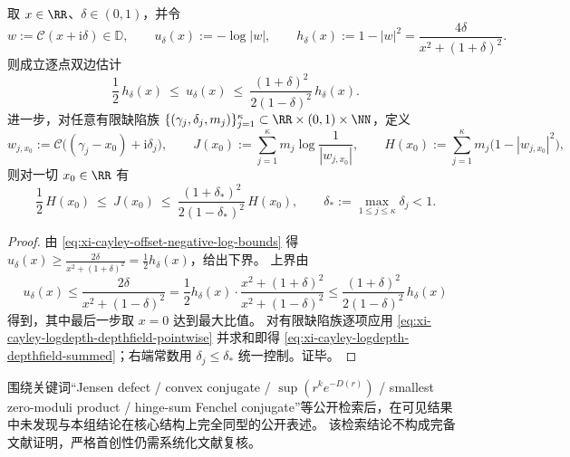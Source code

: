 \begin{corollary}[对数深度与共动深度场的逐点可比性]\label{cor:xi-cayley-logdepth-vs-depthfield-comparability}
取 \(x\in\RR\)、\(\delta\in(0,1)\)，并令
\[
w:=\mathcal C(x+\mathrm{i}\delta)\in\mathbb D,
\qquad
u_\delta(x):=-\log|w|,
\qquad
h_\delta(x):=1-|w|^2=\frac{4\delta}{x^2+(1+\delta)^2}.
\]
则成立逐点双边估计
\begin{equation}\label{eq:xi-cayley-logdepth-depthfield-pointwise}
\boxed{\;
\frac12\,h_\delta(x)\ \le\ u_\delta(x)\ \le\ \frac{(1+\delta)^2}{2(1-\delta)^2}\,h_\delta(x).\;}
\end{equation}
进一步，对任意有限缺陷族 \(\{(\gamma_j,\delta_j,m_j)\}_{j=1}^{\kappa}\subset\RR\times(0,1)\times\NN\)，定义
\[
w_{j,x_0}:=\mathcal C\bigl((\gamma_j-x_0)+\mathrm{i}\delta_j\bigr),
\qquad
J(x_0):=\sum_{j=1}^{\kappa}m_j\log\frac{1}{|w_{j,x_0}|},
\qquad
H(x_0):=\sum_{j=1}^{\kappa}m_j\bigl(1-|w_{j,x_0}|^2\bigr),
\]
则对一切 \(x_0\in\RR\) 有
\begin{equation}\label{eq:xi-cayley-logdepth-depthfield-summed}
\boxed{\;
\frac12\,H(x_0)\ \le\ J(x_0)\ \le\ \frac{(1+\delta_\ast)^2}{2(1-\delta_\ast)^2}\,H(x_0),\qquad
\delta_\ast:=\max_{1\le j\le\kappa}\delta_j<1.\;}
\end{equation}
\end{corollary}
\begin{proof}
由 \eqref{eq:xi-cayley-offset-negative-log-bounds} 得
\(
u_\delta(x)\ge \frac{2\delta}{x^2+(1+\delta)^2}=\frac12 h_\delta(x)
\)，给出下界。
上界由
\[
u_\delta(x)\le \frac{2\delta}{x^2+(1-\delta)^2}
=\frac12 h_\delta(x)\cdot\frac{x^2+(1+\delta)^2}{x^2+(1-\delta)^2}
\le \frac{(1+\delta)^2}{2(1-\delta)^2}\,h_\delta(x)
\]
得到，其中最后一步取 \(x=0\) 达到最大比值。
对有限缺陷族逐项应用 \eqref{eq:xi-cayley-logdepth-depthfield-pointwise} 并求和即得
\eqref{eq:xi-cayley-logdepth-depthfield-summed}；右端常数用 \(\delta_j\le \delta_\ast\) 统一控制。证毕。
\end{proof}

\begin{remark}[可检索性核验说明]\label{rem:xi-jensen-fenchel-public-index-note}
围绕关键词“Jensen defect / convex conjugate / \(\sup(r^k e^{-D(r)})\) / smallest zero-moduli product / hinge-sum Fenchel conjugate”等公开检索后，在可见结果中未发现与本组结论在核心结构上完全同型的公开表述。
该检索结论不构成完备文献证明，严格首创性仍需系统化文献复核。
\end{remark}

\endinput

